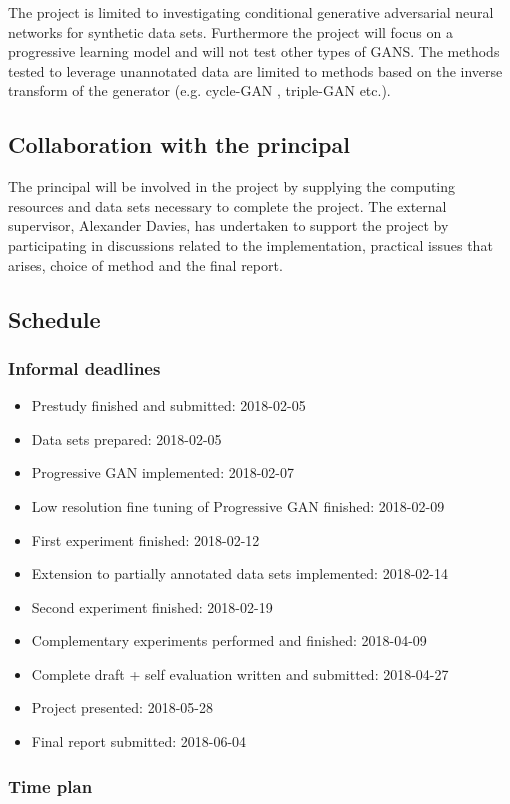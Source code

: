 \documentclass[a4paper]{article}
\begin{document}
The project is limited to investigating conditional generative adversarial neural networks for synthetic data sets. Furthermore the project will focus on a progressive learning model and will not test other types of GANS. The methods tested to leverage unannotated data are limited to methods based on the inverse transform of the generator (e.g. cycle-GAN \cite{zhu2017unpaired}, triple-GAN\cite{li2017triple} etc.). 

\subsection{Collaboration with the principal}
The principal will be involved in the project by supplying the
computing resources and data sets necessary to complete the
project.
The external supervisor, Alexander Davies, has undertaken to support the project by participating in discussions related to the implementation, practical issues that arises, choice of method and the final report.

\subsection{Schedule}
\subsubsection{Informal deadlines}
\begin{itemize}
    \item Prestudy finished and submitted: 2018-02-05
    \item Data sets prepared: 2018-02-05
    \item Progressive GAN implemented: 2018-02-07
    \item Low resolution fine tuning of Progressive GAN finished: 2018-02-09
    \item First experiment finished: 2018-02-12 
    \item Extension to partially annotated data sets implemented: 2018-02-14
    \item Second experiment finished: 2018-02-19
    \item Complementary experiments performed and finished: 2018-04-09
    \item Complete draft + self evaluation written and submitted: 2018-04-27
    \item Project presented: 2018-05-28
    \item Final report submitted: 2018-06-04
\end{itemize}

\subsubsection{Time plan}






\end{document}
